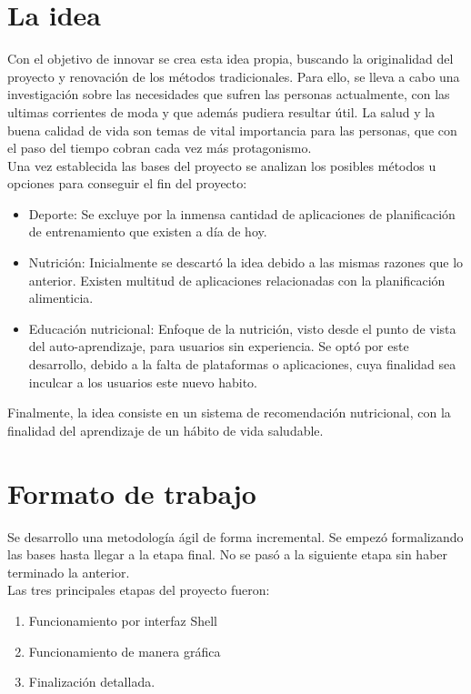 
\section{La idea}

Con el objetivo de innovar se crea esta idea propia, buscando la originalidad del proyecto y renovación de los métodos tradicionales. Para ello, se lleva a cabo una investigación sobre las necesidades que sufren las personas actualmente, con las ultimas corrientes de moda y que además pudiera resultar útil. La salud y la buena calidad de vida son temas de vital importancia para las personas, que con el paso del tiempo cobran cada vez más protagonismo.\\

Una vez establecida las bases del proyecto se analizan los posibles métodos u opciones para conseguir el fin del proyecto:\\

\begin{itemize}
\item	Deporte: Se excluye por la inmensa cantidad de aplicaciones de planificación de entrenamiento que existen a día de hoy.
\item	Nutrición: Inicialmente se descartó la idea debido a las mismas razones que lo anterior. Existen multitud de aplicaciones relacionadas con la planificación alimenticia.
\item	Educación nutricional: Enfoque de la nutrición, visto desde el punto de vista del auto-aprendizaje, para usuarios sin experiencia. Se optó por este desarrollo, debido a la falta de plataformas o aplicaciones, cuya finalidad sea inculcar a los usuarios este nuevo habito.

\end{itemize}
Finalmente, la idea consiste en un sistema de recomendación nutricional, con la finalidad del aprendizaje de un hábito de vida saludable.

\section{Formato de trabajo}
Se desarrollo una metodología ágil de forma incremental. Se empezó formalizando las bases hasta llegar a la etapa final. No se pasó a la siguiente etapa sin haber terminado la anterior.\\

Las tres principales etapas del proyecto fueron:
\begin{enumerate}
\item	Funcionamiento por interfaz Shell
\item	Funcionamiento de manera gráfica
\item	Finalización detallada.
\end{enumerate}

